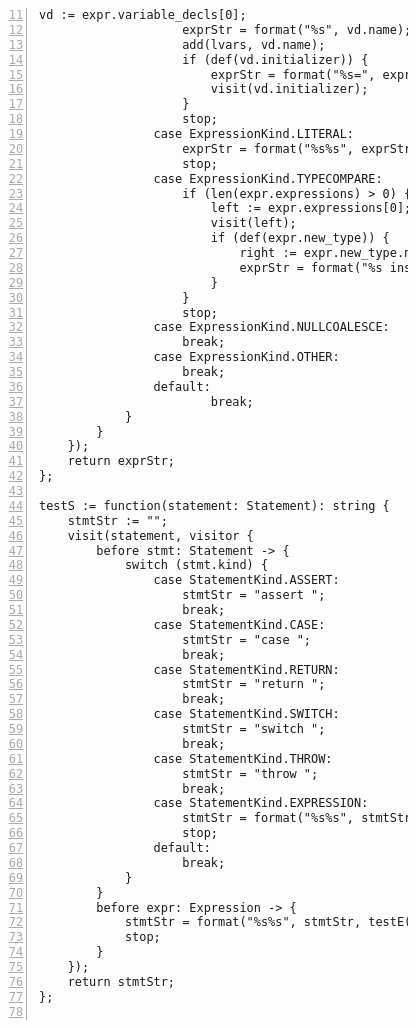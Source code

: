 \begin{figure}[ht!]
\begin{lstlisting}[numbers=left, tabsize=4, escapechar=@, caption={API Usage Mining Analysis},label={lst:aun-code}, firstline = 11, firstnumber = 11, lastline = 60]
                    vd := expr.variable_decls[0];
                    exprStr = format("%s", vd.name);
                    add(lvars, vd.name);
                    if (def(vd.initializer)) {
                        exprStr = format("%s=", exprStr);
                        visit(vd.initializer);
                    }
                    stop;
                case ExpressionKind.LITERAL:
                    exprStr = format("%s%s", exprStr, expr.literal);
                    stop;
                case ExpressionKind.TYPECOMPARE:
                    if (len(expr.expressions) > 0) {
                        left := expr.expressions[0];
                        visit(left);
                        if (def(expr.new_type)) {
                            right := expr.new_type.name;
                            exprStr = format("%s instanceof %s", exprStr, right);
                        }
                    }
                    stop;
                case ExpressionKind.NULLCOALESCE:
                    break;
                case ExpressionKind.OTHER:
                    break;
                default:    
                        break;
            }
        }
    });
    return exprStr;
};

testS := function(statement: Statement): string {
    stmtStr := "";
    visit(statement, visitor {
        before stmt: Statement -> {
            switch (stmt.kind) {
                case StatementKind.ASSERT:
                    stmtStr = "assert ";
                    break;
                case StatementKind.CASE:
                    stmtStr = "case ";
                    break;
                case StatementKind.RETURN:
                    stmtStr = "return ";
                    break;
                case StatementKind.SWITCH:
                    stmtStr = "switch ";
                    break;
                case StatementKind.THROW:
                    stmtStr = "throw ";
                    break;
                case StatementKind.EXPRESSION:
                    stmtStr = format("%s%s", stmtStr, testE(stmt.expression));
                    stop;
                default:    
                    break;
            }
        }
        before expr: Expression -> {
            stmtStr = format("%s%s", stmtStr, testE(expr));    
            stop;
        }
    });
    return stmtStr;
};


\end{lstlisting}
\end{figure}
